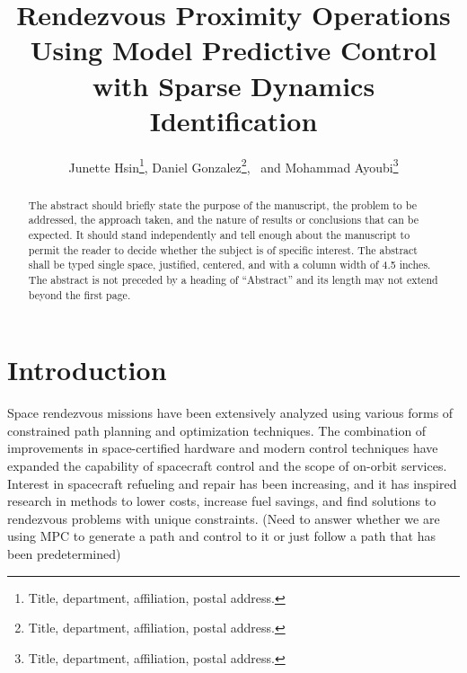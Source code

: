 \documentclass[letterpaper, preprint, paper,11pt]{AAS}	%
\begin{document}
\title{Rendezvous Proximity Operations Using Model Predictive Control with Sparse Dynamics Identification}

\author{Junette Hsin\thanks{Title, department, affiliation, postal address.},  
Daniel Gonzalez\thanks{Title, department, affiliation, postal address.},
\ and Mohammad Ayoubi\thanks{Title, department, affiliation, postal address.}
}


\maketitle{} 		


\begin{abstract}
	
The abstract should briefly state the purpose of the manuscript, the problem to be addressed, the approach taken, and the nature of results or conclusions that can be expected. It should stand independently and tell enough about the manuscript to permit the reader to decide whether the subject is of specific interest. The abstract shall be typed single space, justified, centered, and with a column width of 4.5 inches. The abstract is not preceded by a heading of ``Abstract'' and its length may not extend beyond the first page.

\end{abstract}








\section{Introduction}
%

Space rendezvous missions have been extensively analyzed using various forms of constrained path planning and optimization techniques. The combination of improvements in space-certified hardware and modern control techniques have expanded the capability of spacecraft control and the scope of on-orbit services. Interest in spacecraft refueling and repair has been increasing, and it has inspired research in methods to lower costs, increase fuel savings, and find solutions to rendezvous problems with unique constraints.
(Need to answer whether we are using MPC to generate a path and control to it or just follow a path that has been predetermined) 
\end{document}

